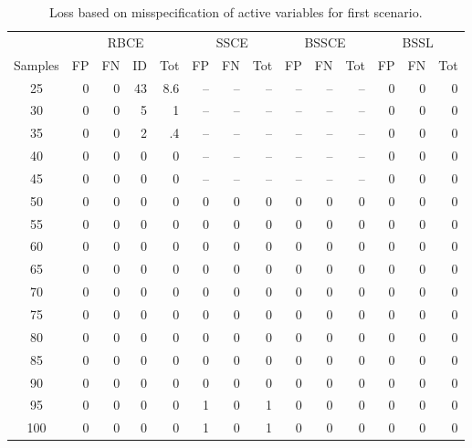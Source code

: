 \documentclass[preprint,12pt]{elsarticle}
\begin{document}
\begin{table}[ht]
\caption{Loss based on misspecification of active variables for first scenario.}\label{tab:misspec}
\centering
\small
\begin{tabular}{|c||rrr|r||rr|r||rr|r||rr|r|}
  \hline
  &\multicolumn{4}{c||}{RBCE}&\multicolumn{3}{c||}{SSCE}
  &\multicolumn{3}{c||}{BSSCE}&\multicolumn{3}{c|}{BSSL}\\
  \cline{2-14}
 Samples & FP & FN & ID & Tot & FP & FN & Tot & FP & FN & Tot & FP & FN & Tot \\ 
  \hline
25 &   0 &   0 &  43 & 8.6 & -- &  --  &  -- &  --  &  -- &  --  &   0 &   0&   0  \\ 
  30 &   0 &   0 &   5 & 1 & -- &  --  &  -- &  --  &  -- &  --  &   0 &   0 &   0 \\ 
  35 &   0 &   0 &   2 & .4 & -- &  --  &  -- &  --  &  -- &  --  &   0 &   0 &   0 \\ 
  40 &   0 &   0 &   0 & 0 &  -- &  --  &  -- &  --  &  -- &  --  &   0 &   0 &   0 \\ 
  45 &   0 &   0 &   0 & 0 & -- &  --  &  -- &  --  &  -- &  --  &    0 &   0 &   0 \\ 
  50 &   0 &   0 &   0 & 0 &   0 &   0 &   0 &   0 &   0 &   0 &   0 &   0 &   0 \\ 
  55 &   0 &   0 &   0 &  0 &  0 &   0 &   0 &   0 &   0 &   0 &   0 &   0 &   0 \\ 
  60 &   0 &   0 &   0 &  0 &  0 &   0 &   0 &   0 &   0 &   0 &   0 &   0 &   0 \\ 
  65 &   0 &   0 &   0 &  0 &  0 &   0 &   0 &   0 &   0 &   0 &   0 &   0 &   0 \\ 
  70 &   0 &   0 &   0 &  0 &  0 &   0 &   0 &   0 &   0 &   0 &   0 &   0 &   0 \\ 
  75 &   0 &   0 &   0 &  0 &  0 &   0 &   0 &   0 &   0 &   0 &   0 &   0 &   0 \\ 
  80 &   0 &   0 &   0 &  0 &  0 &   0 &   0 &   0 &   0 &   0 &   0 &   0 &   0 \\ 
  85 &   0 &   0 &   0 &  0 &  0 &   0 &   0 &   0 &   0 &   0 &   0 &   0 &   0 \\ 
  90 &   0 &   0 &   0 &  0 &  0 &   0 &   0 &   0 &   0 &   0 &   0 &   0 &   0 \\ 
  95 &   0 &   0 &   0 &  0 &  1 &   0 & 1 &   0 &   0 &   0 &   0 &   0 &   0 \\ 
  100 &   0 &   0 &   0 &  0 &  1 &   0 & 1 &  0 &   0 &   0 &   0 &   0 &   0 \\ 

\end{tabular}
\end{table}
\end{document}
